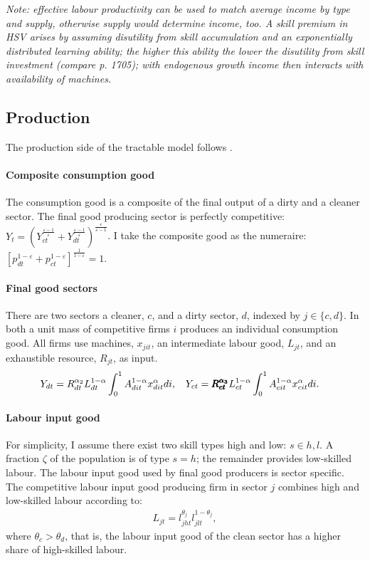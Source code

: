 \textit{Note: effective labour productivity can be used to match average income by type and supply, otherwise supply would determine income, too. A skill premium in HSV arises by assuming disutility from skill accumulation and an exponentially distributed learning ability; the higher this ability the lower the disutility from skill investment (compare p. 1705); with endogenous growth income then interacts with availability of machines. }

\subsection{Production}
The production side of the tractable model follows \cite{Acemoglu2012TheChange}. 
\paragraph{Composite consumption good}
The consumption good is a composite of the final output of a dirty and a cleaner sector. The final good producing sector is perfectly competitive:
$Y_t=\left(Y_{ct}^{\frac{\varepsilon-1}{\varepsilon}}+Y_{dt}^{\frac{\varepsilon-1}{\varepsilon}}\right)^\frac{\varepsilon}{\varepsilon-1}$. 
I take the composite good as the numeraire: $\left[p_{dt}^{1-\varepsilon}+p_{ct}^{1-\varepsilon}\right]^{\frac{1}{1-\varepsilon}}=1$.
\paragraph{Final good sectors}
There are two sectors a cleaner, $c$, and a dirty sector, $d$,  indexed by $j\in\{c,d\}$. In both a unit mass of competitive firms $i$ produces an individual consumption good. All firms use machines, $x_{jit}$, an intermediate labour good, $L_{jt}$, and an exhaustible resource, $R_{jt}$, as input. 
\begin{align*}
&Y_{dt}=R_{dt}^{\alpha_2} L_{dt}^{1-\alpha}\int_{0}^{1}A_{dit}^{1-\alpha}x_{dit}^{\alpha} di,\ \hspace{2mm} Y_{ct}=\pmb{R_{ct}^{\alpha_3}} L_{ct}^{1-\alpha}\int_{0}^{1}A_{cit}^{1-\alpha}x_{cit}^{\alpha} di.
\end{align*}

\paragraph{Labour input good}
For simplicity, I assume there exist two skill types high and low: $s \in {h,l}$. %
A fraction $\zeta$ of the population is of type $s=h$; the remainder provides low-skilled labour. 
The labour input good used by final good producers is sector specific. The competitive labour input good producing firm in sector $j$ combines high and low-skilled labour according to:
\begin{align}
L_{jt}=l_{jht}^{\theta_j}l_{jlt}^{1-\theta_j},
\end{align}
where $\theta_c>\theta_d$, that is, the labour input good of the clean sector has a higher share of high-skilled labour.

